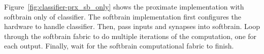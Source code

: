 Figure~\ref{fig:classifier-prx_sb_only} shows the proximate implementation 
with softbrain only of classifier. The softbrain implementation first configures the
hardware to handle classifier. Then, pass inputs and synapses into softbrain. 
Loop through the softbrain fabric to do multiple iterations of the computation, one for each output.
Finally, wait for the softbrain computational fabric to finish. 
